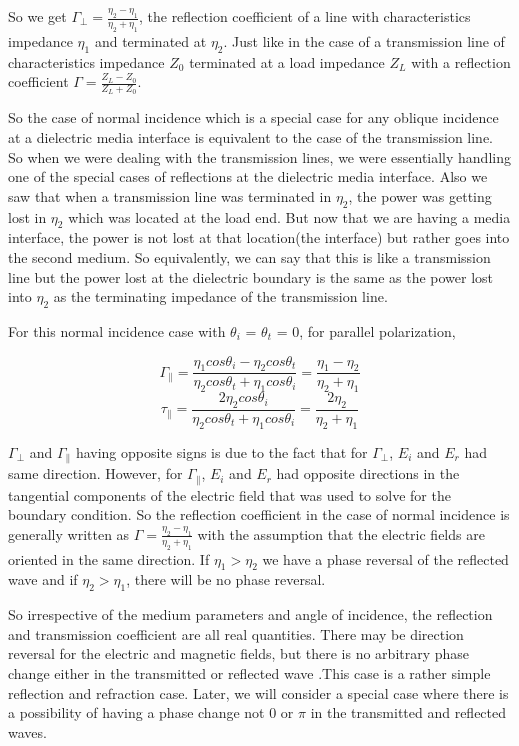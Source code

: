 So we get $\Gamma_{\perp} = \frac{\eta_{2} - \eta_{1}}{\eta_{2} + \eta_{1}}$, the reflection coefficient of a line with characteristics impedance  $\eta_{1}$ and terminated at  $\eta_{2}$. Just like in the case of a transmission line of characteristics impedance $Z_{0}$ terminated at a load impedance $Z_{L}$ with a reflection coefficient $\Gamma = \frac{Z_{L} - Z_{0}}{Z_{L} + Z_{0}}$.

So the case of normal incidence which is a special case for any oblique incidence at a dielectric media interface is equivalent to the case of the transmission line. So when we were dealing with the transmission lines, we were essentially handling one of the special cases of reflections at the dielectric media interface. Also we saw that when a transmission line was terminated in  $\eta_{2}$, the power was getting lost in  $\eta_{2}$ which was located at the load end. But now that we are having a media interface,  the power is not lost at that location(the interface) but rather goes into the second medium. So equivalently, we can say that this is like a transmission line but the power lost at the dielectric boundary is the same as the power lost into  $\eta_{2}$ as the terminating impedance of the transmission line. 

For this normal incidence case with $\theta_{i}$ = $\theta_{t}$ = 0, for parallel polarization,

\begin{dmath*}
\Gamma_{\parallel} = \frac{\eta_{1} cos\theta_{i} - \eta_{2} cos\theta_{t}}{\eta_{2} cos\theta_{t} + \eta_{1} cos\theta_{i}}
= \frac{\eta_{1} -\eta_{2}}{\eta_{2} +\eta_{1}}
\end{dmath*}
\begin{dmath*}
		\tau_{\parallel} = \frac{2\eta_{2} cos\theta_{i} }{\eta_{2} cos\theta_{t} + \eta_{1} cos\theta_{i}} 
		= \frac{2\eta_{2}}{\eta_{2} + \eta_{1}}
\end{dmath*}

$\Gamma_{\perp}$ and $\Gamma_{\parallel}$ having opposite signs is due to the fact that for  $\Gamma_{\perp}$, $E_{i}$ and $E_{r}$ had same direction. However, for  $\Gamma_{\parallel}$, $E_{i}$ and $E_{r}$ had opposite directions in the tangential components of the electric field that was used to solve for the boundary condition. So the reflection coefficient in the case of normal incidence is generally written as $\Gamma = \frac{\eta_{2} - \eta_{1}}{\eta_{2} + \eta_{1}}$  with the assumption that the electric fields are oriented in the same direction. If $\eta_{1}>\eta_{2}$ we have a phase reversal of the reflected wave and if $\eta_{2}>\eta_{1}$, there will be no phase reversal. 

So irrespective of the medium parameters and angle of incidence, the reflection and transmission coefficient are all real quantities. There may be direction reversal for the electric and magnetic fields,  but there is no arbitrary phase change either in the transmitted or reflected wave  .This case is a rather simple reflection and refraction case. Later, we will consider a special case where there is a possibility of having a phase change not $0$ or $\pi$ in the transmitted and reflected waves. 